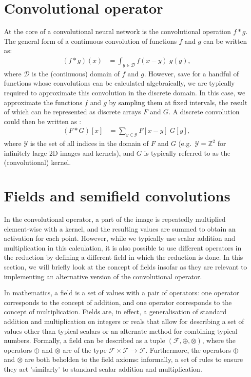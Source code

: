 \documentclass[a4paper, 12pt]{report}
\begin{document}
\section{Convolutional operator}
At the core of a convolutional neural network is the convolutional operation $f*g$. The general form of a continuous convolution of functions $f$ and $g$ can be written as:
\begin{align}
(f*g)(x) &= \int_{y\in\mathcal{D}} f(x-y)\; g(y)	,
\end{align}
where $\mathcal{D}$ is the (continuous) domain of $f$ and $g$. However, save for a handful of functions whose convolutions can be calculated algebraically, we are typically required to approximate this convolution in the discrete domain. In this case, we approximate the functions $f$ and $g$ by sampling them at fixed intervals, the result of which can be represented as discrete arrays $F$ and $G$. A discrete convolution could then be written as \cite{szeliski2022computer}:
\begin{align}
(F*G)[x] &= \sum_{y\in\mathcal{Y}} F[x-y]\; G[y],
\end{align}
where $\mathcal{Y}$ is the set of all indices in the domain of $F$ and $G$ (e.g.\ $\mathcal{Y}=\mathbb{Z}^2$ for infinitely large 2D images and kernels), and $G$ is typically referred to as the (convolutional) kernel.


\section{Fields and semifield convolutions}
In the convolutional operator, a part of the image is repeatedly multiplied element-wise with a kernel, and the resulting values are summed to obtain an activation for each point. However, while we typically use scalar addition and multiplication in this calculation, it is also possible to use different operators in the reduction by defining a different field in which the reduction is done. In this section, we will briefly look at the concept of fields insofar as they are relevant to implementing an alternative version of the convolutional operator.

In mathematics, a field is a set of values with a pair of operators: one operator corresponds to the concept of addition, and one operator corresponds to the concept of multiplication. Fields are, in effect, a generalisation of standard addition and multiplication on integers or reals that allow for describing a set of values other than typical scalars or an alternate method for combining typical numbers. Formally, a field can be described as a tuple $(\mathcal{F}, \oplus, \otimes)$, where the operators $\oplus$ and $\otimes$ are of the type $\mathcal{F}\times\mathcal{F}\rightarrow\mathcal{F}$. Furthermore, the operators $\oplus$ and $\otimes$ are both beholden to the field axioms: informally, a set of rules to ensure they act 'similarly' to standard scalar addition and multiplication. 
\end{document}

